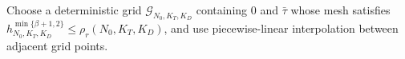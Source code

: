 Choose a deterministic grid \(\mathcal G_{N_0,K_T,K_D}\) containing \(0\) and \(\bar\tau\) whose mesh satisfies \(h_{N_0,K_T,K_D}^{\min\{\beta+1,2\}}\le\rho_r(N_0,K_T,K_D)\), and use piecewise-linear interpolation between adjacent grid points.